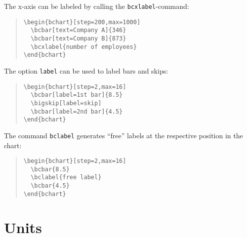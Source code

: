 \documentclass{article}
\begin{document}
The x-axis can be labeled by calling the \texttt{bcxlabel}-command:
\begin{quote}\small
\begin{verbatim}
\begin{bchart}[step=200,max=1000]
  \bcbar[text=Company A]{346}
  \bcbar[text=Company B]{873}
  \bcxlabel{number of employees}
\end{bchart}
\end{verbatim}
\end{quote}
\begin{quote}
\begin{bchart}[step=200,max=1000]
\end{bchart}
\end{quote}
The option \texttt{label} can be used to label bars and skips:
\begin{quote}\small
\begin{verbatim}
\begin{bchart}[step=2,max=16]
  \bcbar[label=1st bar]{8.5}
  \bigskip[label=skip]
  \bcbar[label=2nd bar]{4.5}
\end{bchart}
\end{verbatim}
\end{quote}
\begin{quote}
\begin{bchart}[step=2,max=16]
  \bigskip[label=skip]
\end{bchart}
\end{quote}
The command \texttt{bclabel} generates ``free'' labels at the respective position in the chart:
\begin{quote}\small
\begin{verbatim}
\begin{bchart}[step=2,max=16]
  \bcbar{8.5}
  \bclabel{free label}
  \bcbar{4.5}
\end{bchart}
\end{verbatim}
\end{quote}
\begin{quote}
\begin{bchart}[step=2,max=16]
\end{bchart}
\end{quote}


\section{Units}
\end{document}
